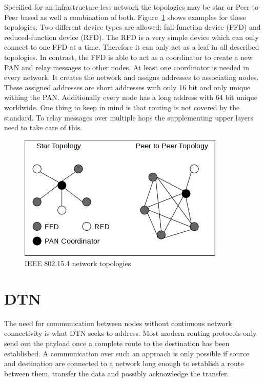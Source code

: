 Specified for an infrastructure-less network the topologies may be star or
Peer-to-Peer based as well a combination of both. Figure~\ref{fig:802154topologies}
shows examples for these topologies. Two different device types are allowed:
full-function device (FFD) and
reduced-function device (RFD). The RFD is a very simple device which can only
connect to one FFD at a time. Therefore it can only act as a leaf in all
described topologies. In contrast, the FFD is able to act as a coordinator to
create a new PAN and relay messages to other nodes. At least one coordinator
is needed in every network. It creates the network and assigns addresses to
associating nodes. These assigned addresses are short addresses with only 16 bit
and only unique withing the PAN. Additionally every node has a long address with
64 bit unique worldwide. One thing to keep in mind is that routing is not
covered by the standard. To relay messages over multiple hops the supplementing
upper layers need to take care of this.

\begin{figure}
  \begin{center}
    \includegraphics[height=6cm]{images/802154topology}
    \caption{IEEE 802.15.4 network topologies}
        \label{fig:802154topologies}
  \end{center}
\end{figure}

\section{DTN}
\label{introdtn}
The need for communication between nodes without continuous network
connectivity is what DTN seeks to address. Most modern routing protocols only
send out the payload once a complete route to the destination has been established.
A communication over such an approach is only possible if source and destination
are connected to a network long enough to establish a route between them,
transfer the data and possibly acknowledge the transfer.

